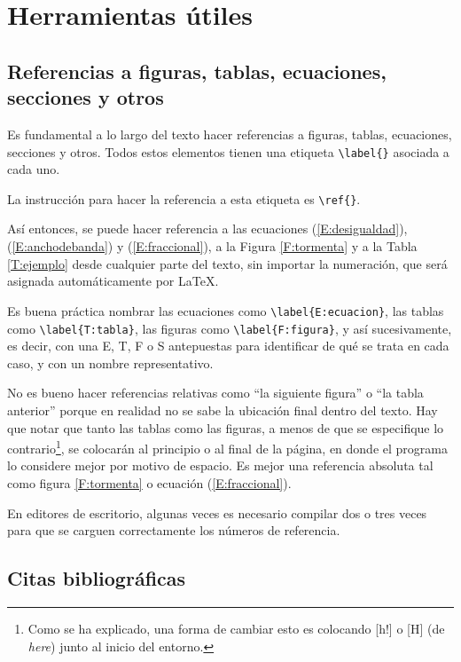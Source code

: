 \section{Herramientas útiles}

\subsection{Referencias a figuras, tablas, ecuaciones, secciones y otros}

Es fundamental a lo largo del texto hacer referencias a figuras, tablas, ecuaciones, secciones y otros. Todos estos elementos tienen una etiqueta \verb+\label{}+ asociada a cada uno. 

La instrucción para hacer la referencia a esta etiqueta es \verb+\ref{}+.

Así entonces, se puede hacer referencia a las ecuaciones (\ref{E:desigualdad}), (\ref{E:anchodebanda}) y (\ref{E:fraccional}), a la Figura \ref{F:tormenta} y a la Tabla \ref{T:ejemplo} desde cualquier parte del texto, sin importar la numeración, que será asignada automáticamente por \LaTeX.

Es buena práctica nombrar las ecuaciones como \verb+\label{E:ecuacion}+, las tablas como \verb+\label{T:tabla}+, las figuras como \verb+\label{F:figura}+, y así sucesivamente, es decir, con una E, T, F o S antepuestas para identificar de qué se trata en cada caso, y con un nombre representativo. 

No es bueno hacer referencias relativas como ``la siguiente figura'' o ``la tabla anterior'' porque en realidad no se sabe la ubicación final dentro del texto. Hay que notar que tanto las tablas como las figuras, a menos de que se especifique lo contrario\footnote{Como se ha explicado, una forma de cambiar esto es colocando [h!] o [H] (de \emph{here}) junto al inicio del entorno.}, se colocarán al principio o al final de la página, en donde el programa lo considere mejor por motivo de espacio. Es mejor una referencia absoluta tal como figura \ref{F:tormenta} o ecuación (\ref{E:fraccional}). 

En editores de escritorio, algunas veces es necesario compilar dos o tres veces para que se carguen correctamente los números de referencia.

\subsection{Citas bibliográficas}

